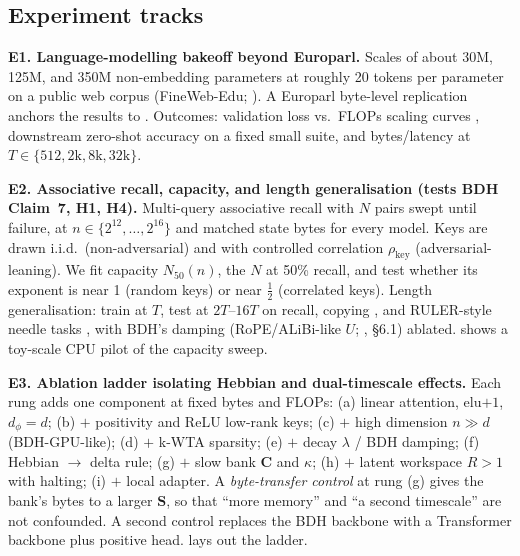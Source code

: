 \documentclass[11pt]{article}
\theoremstyle{remark}
\newcommand{\Sm}{\mathbf{S}}
\newcommand{\Cm}{\mathbf{C}}
\begin{document}
\subsection{Experiment tracks}

\textbf{E1. Language-modelling bakeoff beyond Europarl.} Scales of about 30M, 125M, and 350M non-embedding
parameters at roughly 20 tokens per parameter \citep{hoffmann2022chinchilla} on a public web corpus
(FineWeb-Edu; \citealp{penedo2024fineweb}). A Europarl byte-level replication \citep{koehn2005europarl} anchors the
results to \citet[App.~B.2]{kosowski2025bdh}. Outcomes: validation loss vs.\ FLOPs scaling curves
\citep{kaplan2020scaling}, downstream zero-shot accuracy on a fixed small suite, and bytes/latency at
$T\in\{512,2\text{k},8\text{k},32\text{k}\}$.

\textbf{E2. Associative recall, capacity, and length generalisation (tests BDH Claim~7, H1, H4).}
Multi-query associative recall \citep{arora2023zoology} with $N$ pairs swept until failure, at $n\in\{2^{12},\dots,2^{16}\}$
and matched state bytes for every model. Keys are drawn i.i.d.\ (non-adversarial) and with controlled correlation
$\rho_{\text{key}}$ (adversarial-leaning). We fit capacity $N_{50}(n)$, the $N$ at 50\% recall, and test whether
its exponent is near 1 (random keys) or near $\tfrac12$ (correlated keys). Length generalisation: train at $T$,
test at $2T$--$16T$ on recall, copying \citep{jelassi2024repeat}, and RULER-style needle tasks
\citep{hsieh2024ruler}, with BDH's damping (RoPE/ALiBi-like $U$; \citealp{kosowski2025bdh}, \S6.1) ablated.  shows a toy-scale CPU pilot of the capacity sweep.



\textbf{E3. Ablation ladder isolating Hebbian and dual-timescale effects.} Each rung adds one component at fixed
bytes and FLOPs:
(a) linear attention, elu$+1$, $d_\phi=d$;
(b) $+$ positivity and ReLU low-rank keys;
(c) $+$ high dimension $n\gg d$ (BDH-GPU-like);
(d) $+$ k-WTA sparsity;
(e) $+$ decay $\lambda$ / BDH damping;
(f) Hebbian $\to$ delta rule;
(g) $+$ slow bank $\Cm$ and $\kappa$;
(h) $+$ latent workspace $R>1$ with halting;
(i) $+$ local adapter.
A \emph{byte-transfer control} at rung (g) gives the bank's bytes to a larger $\Sm$, so that ``more memory'' and
``a second timescale'' are not confounded. A second control replaces the BDH backbone with a Transformer
backbone plus positive head.  lays out the ladder.


\end{document}
